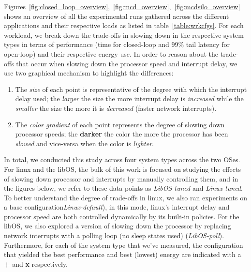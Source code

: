 \label{sec:exp}
Figures~\ref{fig:closed_loop_overview},~\ref{fig:mcd_overview},~\ref{fig:mcdsilo_overview} shows an overview of all the experimental runs gathered across the different applications and their respective loads as listed in table~\ref{table:wrkcfgs}. For each workload, we break down the trade-offs in slowing down in the respective system types in terms of performance (time for closed-loop and 99\% tail latency for open-loop) and their respective energy use. In order to reason about the trade-offs that occur when slowing down the processor speed and interrupt delay, we use two graphical mechanism to highlight the differences: 
\begin{enumerate}
    \item The \textit{size} of each point is representative of the degree with which the interrupt delay used; the {\larger[1]\textit{larger}} the size the more interrupt delay is \textit{increased} while the \textit{smaller} the size the more it is \textit{decreased} (faster network interrupts).
    \item The \textit{color gradient} of each point represents the degree of slowing down processor speeds; the \textbf{darker} the color the more the processor has been \textit{slowed} and vice-versa when the color is \textit{lighter}.
\end{enumerate}

In total, we conducted this study across four system types across the two OSes. For linux and the libOS, the bulk of this work is focused on studying the effects of slowing down processor and interrupts by manually controlling them, and in the figures below, we refer to these data points as \textit{LibOS-tuned} and \textit{Linux-tuned}. To better understand the degree of trade-offs in linux, we also ran experiments on a base configuration\textit{Linux-default}), in this mode, linux's interrupt delay and processor speed are both controlled dynamically by its built-in policies. For the libOS, we also explored a version of slowing down the processor by replacing network interrupts with a polling loop (no sleep states used) (\textit{LibOS-poll}). Furthermore, for each of the system type that we've measured, the configuration that yielded the best performance and best (lowest) energy are indicated with a {\larger[4]\textbf{+}} and {\larger[4]\textbf{x}} respectively.